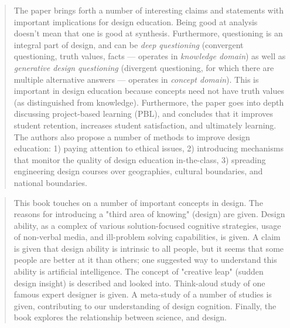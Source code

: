		\begin{quote}
		\small
		The paper brings forth a number of interesting claims and statements with
		important implications for design education.
		Being good at analysis doesn't mean that one is good at synthesis.
		Furthermore, questioning is an integral part of design, and can be
		{\em deep questioning} (convergent questioning, truth values, facts --- operates
		in {\em knowledge domain}) as well as
		{\em generative design questioning} (divergent questioning, for which there are
		multiple alternative answers --- operates in {\em concept domain}).
		This is important in design education because concepts need not have truth values
		(as distinguished from knowledge). Furthermore, the paper goes into depth
		discussing project-based learning (PBL), and concludes that it improves student
		retention, increases student satisfaction, and ultimately learning.
		The authors also propose a number of methods to improve design education:
		1) paying attention to ethical issues,
		2) introducing mechanisms that monitor the quality of design education in-the-class,
		3) spreading engineering design courses over geographies, cultural boundaries, and
		national boundaries.
		\end{quote}

		\begin{quote}
		\small
		This book touches on a number of important concepts in design.
		The reasons for introducing a "third area of knowing" (design) are given.
		Design ability, as a complex of various solution-focused cognitive strategies, 
		usage of non-verbal media, and ill-problem solving capabilities, is given.
		A claim is given that design ability is intrinsic to all people, but
		it seems that some people are better at it than others; one suggested
		way to understand this ability is artificial intelligence.
		The concept of "creative leap" (sudden design insight) is described and looked into.
		Think-aloud study of one famous expert designer is given.
		A meta-study of a number of studies is given, contributing to our understanding
		of design cognition. Finally, the book explores the relationship between science,
		and design.
		\end{quote}

